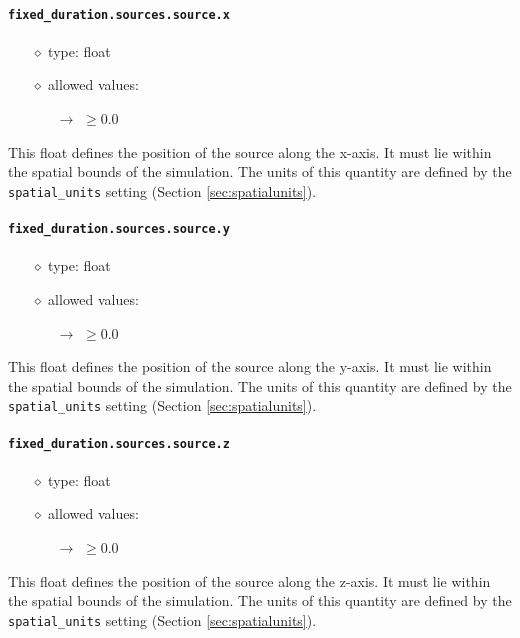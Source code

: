 \documentclass[]{article}
\def\code#1{\texttt{#1}}
\begin{document}
\paragraph{\code{fixed\_duration.sources.source.x}}\label{sec:fixsourcex}
\begin{itemize}
    \item[$\diamond$] type: float 
    \item[$\diamond$] allowed values:
    \begin{itemize}
        \item[$\rightarrow$] $\geq0.0$
    \end{itemize}
\end{itemize}
This float defines the position of the source along the x-axis. It must lie
within the spatial bounds of the simulation. The units of this quantity are
defined by the \code{spatial\_units} setting (Section \ref{sec:spatialunits}).

\paragraph{\code{fixed\_duration.sources.source.y}}\label{sec:fixsourcey}
\begin{itemize}
    \item[$\diamond$] type: float 
    \item[$\diamond$] allowed values:
    \begin{itemize}
        \item[$\rightarrow$] $\geq0.0$
    \end{itemize}
\end{itemize}
This float defines the position of the source along the y-axis. It must lie
within the spatial bounds of the simulation. The units of this quantity are
defined by the \code{spatial\_units} setting (Section \ref{sec:spatialunits}).

\paragraph{\code{fixed\_duration.sources.source.z}}\label{sec:fixsourcez}
\begin{itemize}
    \item[$\diamond$] type: float 
    \item[$\diamond$] allowed values:
    \begin{itemize}
        \item[$\rightarrow$] $\geq0.0$
    \end{itemize}
\end{itemize}
This float defines the position of the source along the z-axis. It must lie
within the spatial bounds of the simulation. The units of this quantity are
defined by the \code{spatial\_units} setting (Section \ref{sec:spatialunits}).
\end{document}
